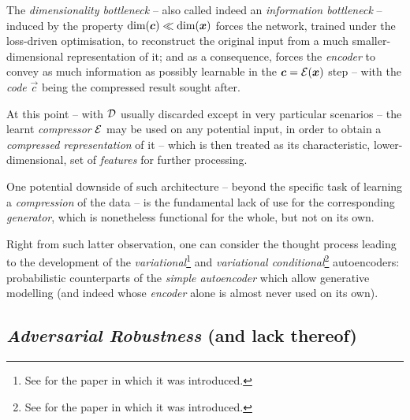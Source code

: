 The \textit{dimensionality bottleneck} -- also called indeed an \textit{information bottleneck} -- induced by the property $\text{dim}(\bm{c}) \ll \text{dim}(\bm{x})$ forces the network, trained under the loss-driven optimisation, to reconstruct the original input from a much smaller-dimensional representation of it; and as a consequence, forces the \textit{encoder} to convey as much information as possibly learnable in the $\bm{c} = \mathcal{E}(\bm{x})$ step -- with the \textit{code} $\vec{c}$ being the compressed result sought after.

At this point -- with $\mathcal{D}$ usually discarded except in very particular scenarios -- the learnt \textit{compressor} $\mathcal{E}$ may be used on any potential input, in order to obtain a \textit{compressed representation} of it -- which is then treated as its characteristic, lower-dimensional, set of \textit{features} for further processing.

One potential downside of such architecture -- beyond the specific task of learning a \textit{compression} of the data -- is the fundamental lack of use for the corresponding \textit{generator}, which is nonetheless functional for the whole, but not on its own.

Right from such latter observation, one can consider the thought process leading to the development of the \textit{variational}\footnote{See \cite{KingmaWelling2014AutoEncoding} for the paper in which it was introduced.} and \textit{variational conditional}\footnote{See \cite{SohnEtAl2015CVAE} for the paper in which it was introduced.} autoencoders: probabilistic counterparts of the \textit{simple autoencoder} which allow generative modelling (and indeed whose \textit{encoder} alone is almost never used on its own).


\subsection{\textit{Adversarial Robustness} (and lack thereof)}
